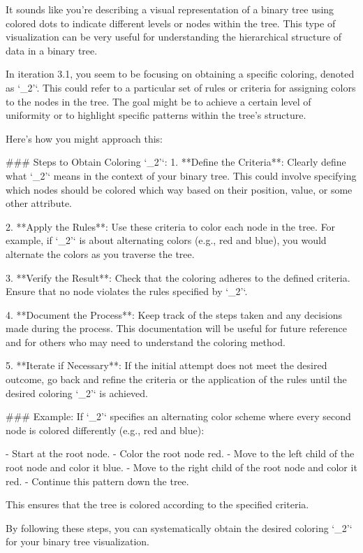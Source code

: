 It sounds like you're describing a visual representation of a binary tree using colored dots to indicate different levels or nodes within the tree. This type of visualization can be very useful for understanding the hierarchical structure of data in a binary tree.

In iteration 3.1, you seem to be focusing on obtaining a specific coloring, denoted as `_2'`. This could refer to a particular set of rules or criteria for assigning colors to the nodes in the tree. The goal might be to achieve a certain level of uniformity or to highlight specific patterns within the tree's structure.

Here’s how you might approach this:

### Steps to Obtain Coloring `_2'`:
1. **Define the Criteria**: Clearly define what `_2'` means in the context of your binary tree. This could involve specifying which nodes should be colored which way based on their position, value, or some other attribute.
   
2. **Apply the Rules**: Use these criteria to color each node in the tree. For example, if `_2'` is about alternating colors (e.g., red and blue), you would alternate the colors as you traverse the tree.

3. **Verify the Result**: Check that the coloring adheres to the defined criteria. Ensure that no node violates the rules specified by `_2'`.

4. **Document the Process**: Keep track of the steps taken and any decisions made during the process. This documentation will be useful for future reference and for others who may need to understand the coloring method.

5. **Iterate if Necessary**: If the initial attempt does not meet the desired outcome, go back and refine the criteria or the application of the rules until the desired coloring `_2'` is achieved.

### Example:
If `_2'` specifies an alternating color scheme where every second node is colored differently (e.g., red and blue):

- Start at the root node.
- Color the root node red.
- Move to the left child of the root node and color it blue.
- Move to the right child of the root node and color it red.
- Continue this pattern down the tree.

This ensures that the tree is colored according to the specified criteria.

By following these steps, you can systematically obtain the desired coloring `_2'` for your binary tree visualization.